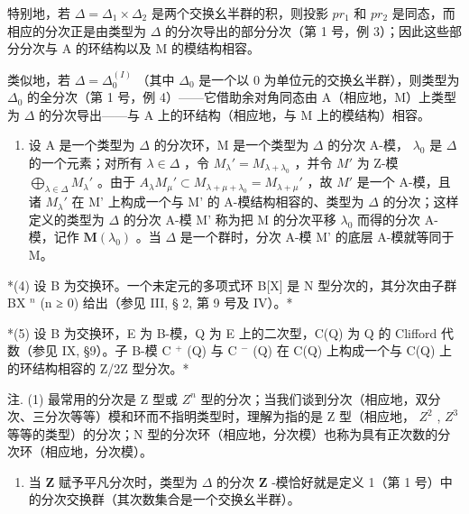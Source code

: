 特别地，若 \(\Delta = \Delta_{1} \times \Delta_{2}\) 是两个交换幺半群的积，则投影 \(pr_{1}\) 和 \(pr_{2}\) 是同态，而相应的分次正是由类型为 \(\Delta\) 的分次导出的部分分次（第 1 号，例 3）；因此这些部分分次与 A 的环结构以及 M 的模结构相容。

类似地，若 \(\Delta = \Delta_0^{(I)}\) （其中 \(\Delta_0\) 是一个以 0 为单位元的交换幺半群），则类型为 \(\Delta_0\) 的全分次（第 1 号，例 4）——它借助余对角同态由 A（相应地，M）上类型为 \(\Delta\) 的分次导出——与 A 上的环结构（相应地，与 M 上的模结构）相容。

\begin{enumerate}
\def\labelenumi{(\arabic{enumi})}
\setcounter{enumi}{2}
\tightlist
\item
  设 A 是一个类型为 \(\Delta\) 的分次环，M 是一个类型为 \(\Delta\) 的分次 A-模， \(\lambda_0\) 是 \(\Delta\) 的一个元素；对所有 \(\lambda \in \Delta\) ，令 \(M_{\lambda}' = M_{\lambda + \lambda_0}\) ，并令 \(M'\) 为 Z-模 \(\bigoplus_{\lambda \in \Delta} M_{\lambda}'\) 。由于 \(A_{\lambda}M_{\mu}' \subset M_{\lambda + \mu + \lambda_0} = M_{\lambda + \mu}'\) ，故 \(M'\) 是一个 A-模，且诸 \(M_{\lambda}'\) 在 M' 上构成一个与 M' 的 A-模结构相容的、类型为 \(\Delta\) 的分次；这样定义的类型为 \(\Delta\) 的分次 A-模 M' 称为把 M 的分次平移 \(\lambda_{0}\) 而得的分次 A-模，记作 \(\mathbf{M}(\lambda_{0})\) 。当 \(\Delta\) 是一个群时，分次 A-模 M' 的底层 A-模就等同于 M。
\end{enumerate}

*(4) 设 B 为交换环。一个未定元的多项式环 B{[}X{]} 是 N 型分次的，其分次由子群 BX \(^{n}\) (n ≥ 0) 给出（参见 III, § 2, 第 9 号及 IV）。*

*(5) 设 B 为交换环，E 为 B-模，Q 为 E 上的二次型，C(Q) 为 Q 的 Clifford 代数（参见 IX, §9）。子 B-模 C \(^{+}\) (Q) 与 C \(^{-}\) (Q) 在 C(Q) 上构成一个与 C(Q) 上的环结构相容的 Z/2Z 型分次。*

注. (1) 最常用的分次是 Z 型或 \(Z^{n}\) 型的分次；当我们谈到分次（相应地，双分次、三分次等等）模和环而不指明类型时，理解为指的是 Z 型（相应地， \(Z^{2}\) , \(Z^{3}\) 等等的类型）的分次；N 型的分次环（相应地，分次模）也称为具有正次数的分次环（相应地，分次模）。

\begin{enumerate}
\def\labelenumi{(\arabic{enumi})}
\setcounter{enumi}{1}
\tightlist
\item
  当 \(\mathbf{Z}\) 赋予平凡分次时，类型为 \(\Delta\) 的分次 \(\mathbf{Z}\) -模恰好就是定义 1（第 1 号）中的分次交换群（其次数集合是一个交换幺半群）。
\end{enumerate}

